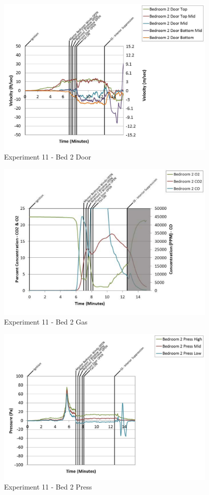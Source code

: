 \documentclass{article}
\begin{document}
\begin{appendices}
	\clearpage

	\begin{figure}[h!]
		\centering
		\includegraphics[height=3.05in]{0_Images/Results_Charts/Exp_11_Charts/Bed2Door.pdf}
		\caption{Experiment 11 - Bed 2 Door}
	\end{figure}
 

	\begin{figure}[h!]
		\centering
		\includegraphics[height=3.05in]{0_Images/Results_Charts/Exp_11_Charts/Bed2Gas.pdf}
		\caption{Experiment 11 - Bed 2 Gas}
	\end{figure}
 
	\clearpage

	\begin{figure}[h!]
		\centering
		\includegraphics[height=3.05in]{0_Images/Results_Charts/Exp_11_Charts/Bed2Press.pdf}
		\caption{Experiment 11 - Bed 2 Press}
	\end{figure}
 


\end{appendices}
\end{document}
